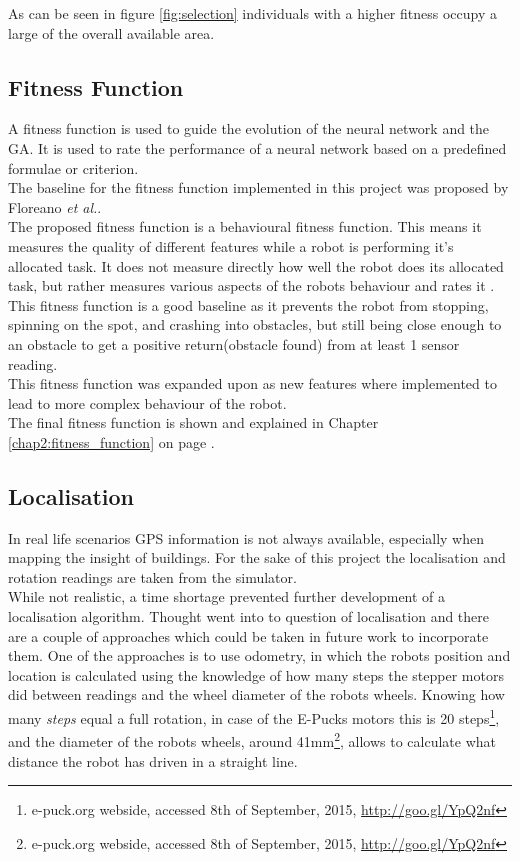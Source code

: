 
As can be seen in figure \ref{fig:selection} individuals with a higher fitness occupy a large of the overall available area. \\

\subsection{Fitness Function}
A fitness function is used to guide the evolution of the neural network and the GA. It is used to rate the performance of a neural network based on a predefined formulae or criterion.\\
The baseline for the fitness function implemented in this project was proposed by Floreano \textit{et al.}\cite{499791}. \\
The proposed fitness function is a behavioural fitness function. This means it measures the quality of different features while a robot is performing it's allocated task. It does not measure directly how well the robot does its allocated task, but rather measures various aspects of the robots behaviour and rates it \cite{Nelson2009Fitness}.
This fitness function is a good baseline as it prevents the robot from stopping, spinning on the spot, and crashing into obstacles, but still being close enough to an obstacle to get a positive return(obstacle found) from at least 1 sensor reading. \\
This fitness function was expanded upon as new features where implemented to lead to more complex behaviour of the robot.\\
The final fitness function is shown and explained in Chapter \ref{chap2:fitness_function} on page \pageref{chap2:fitness_function}.

\subsection{Localisation}
In real life scenarios GPS information is not always available, especially when mapping the insight of buildings. 
For the sake of this project the localisation and rotation readings are taken from the simulator. \\

While not realistic, a time shortage prevented further development of a localisation algorithm.
Thought went into to question of localisation and there are a couple of approaches which could be taken in future work to incorporate them. 
One of the approaches is to use odometry, in which the robots position and location is calculated using the knowledge of how many steps the stepper motors did between readings and the wheel diameter of the robots wheels. Knowing how many \textit{steps} equal a full rotation, in case of the E-Pucks motors this is 20 steps\footnote{e-puck.org webside, accessed 8th of September, 2015, \url{http://goo.gl/YpQ2nf}}, and the diameter of the robots wheels, around 41mm\footnote{e-puck.org webside, accessed 8th of September, 2015, \url{http://goo.gl/YpQ2nf}}, allows to calculate what distance the robot has driven in a straight line. \\

